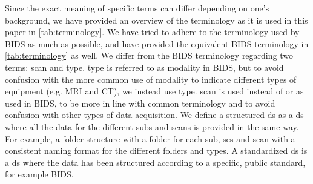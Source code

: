 Since the exact meaning of specific terms can differ depending on one's background, we have provided an overview of the terminology as it is used in this paper in \cref{tab:terminology}.
We have tried to adhere to the terminology used by \gls{BIDS} as much as possible, and have provided the equivalent \gls{BIDS} terminology in \cref{tab:terminology} as well.
We differ from the \gls{BIDS} terminology regarding two terms: \gls{scan} and \gls{type}.
\Gls{type} is referred to as modality in \gls{BIDS}, but to avoid confusion with the more common use of modality to indicate different types of equipment (e.g. \gls{MRI} and \gls{CT}), we instead use \gls{type}.
\Gls{scan} is used instead of  or  as used in \gls{BIDS}, to be more in line with common terminology and to avoid confusion with other types of data acquisition.
We define a structured \gls{ds} as a \gls{ds} where all the data for the different \glspl{sub} and \glspl{scan} is provided in the same way.
For example, a folder structure with a folder for each \gls{sub}, \gls{ses} and \gls{scan} with a consistent naming format for the different folders and \glspl{type}.
A standardized \gls{ds} is a \gls{ds} where the data has been structured according to a specific, public standard, for example \gls{BIDS}.


